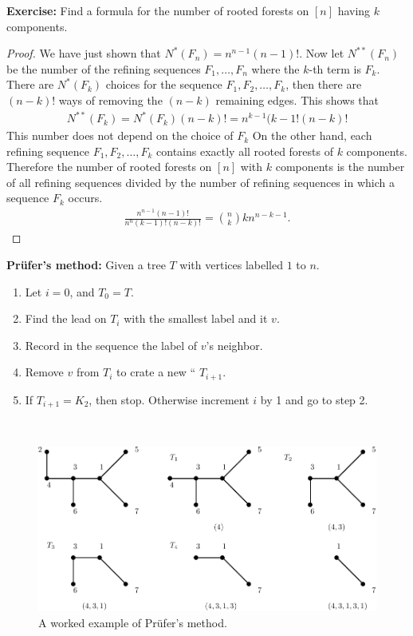 \documentclass[12pt,a4paper]{article}
\theoremstyle{definition}
\begin{document}
\newpage
\textbf{Exercise:} Find a formula for the number of rooted forests on $[n]$ having $k$ components.
\begin{proof}
We have just shown that $N^*(F_n)=n^{n-1}(n-1)!$. Now let $N^{**}(F_n)$ be the number of the refining sequences $F_1, \dots , F_n$ where the $k$-th term is $F_k$. There are $N^*(F_k)$ choices for the sequence $F_1, F_2, \dots , F_k$, then there are $(n-k)!$ ways of removing the $(n-k)$ remaining edges. This shows that
\begin{align*}
N^{**}(F_k)=N^*(F_k)(n-k)!=n^{k-1}(k-1!(n-k)!
\end{align*}
This number does not depend on the choice of $F_k$ On the other hand,  each refining sequence $F_1,  F_2, \dots , F_k$ contains exactly all rooted forests of $k$ components. Therefore the number of rooted forests on $[n]$ with $k$ components is the number of all refining sequences divided by the number of refining sequences in which a sequence $F_k$ occurs. 
\begin{align*}
\frac{n^{n-1}(n-1)!	}{n^n(k-1)!(n-k)!} = {n \choose k} kn^{n-k-1}. 
\end{align*}
\end{proof}
\newpage
\textbf{Prüfer's method:} Given a tree $T$ with vertices labelled $1$ to $n$.
\begin{enumerate}
\item Let $i=0$, and $T_0=T$.
\item Find the lead on $T_i$ with the smallest label and it $v$.
\item Record in the sequence the label of $v$'s neighbor.
\item Remove $v$ from $T_i$ to crate a new `` $T_{i+1}.$
\item If $T_{i+1}=K_2$, then stop. Otherwise increment $i$ by 1 and go to step 2. 
\end{enumerate} 
\
\begin{figure}[hbtp]
\centering
\includegraphics[scale=.8]{images/graph31.pdf}
\caption{A worked example of Prüfer's method.}
\end{figure}
\end{document}
